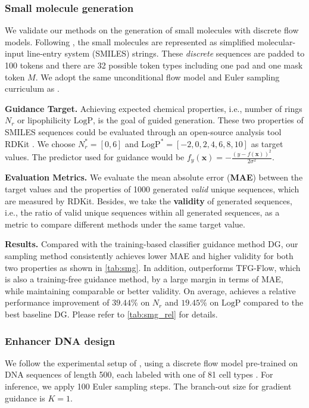 \subsubsection{Small molecule generation} 

We validate our methods on the generation of small molecules with discrete flow models. Following \citet{nisonoff2024unlocking}, the small molecules are represented as simplified molecular-input line-entry system (SMILES) strings. These \textit{discrete} sequences are padded to 100 tokens and there are 32 possible token types including one pad and one mask token $M$. We adopt the same unconditional flow model and Euler sampling curriculum as \citet{nisonoff2024unlocking}.

\textbf{Guidance Target.} Achieving expected chemical properties, i.e., number of rings $N_r$ or lipophilicity $\mathrm{LogP}$, is the goal of guided generation. These two properties of SMILES sequences could be evaluated through an open-source analysis tool RDKit \citep{landrum2013rdkit}. We choose $N_r^*=[0,6]$ and $\mathrm{LogP}^*=[-2,0,2,4,6,8,10]$ as target values.
The predictor used for guidance would be
$f_y(\boldsymbol{x})= -\frac{(y-f(\boldsymbol{x}))^2}{2\sigma^2}$.

\textbf{Evaluation Metrics.} We evaluate the mean absolute error (\textbf{MAE}) between the target values and the properties of 1000 generated \textit{valid} unique sequences, which are measured by RDKit. Besides, we take the \textbf{validity} of generated sequences, i.e., the ratio of valid unique sequences within all generated sequences,  as a metric to compare different methods under the same target value. 

\textbf{Results.} Compared with the training-based classifier guidance method DG, our sampling method \xtsampling consistently achieves lower MAE and higher validity for both two properties as shown in  \cref{tab:smg}. In addition, \xtsampling outperforms TFG-Flow, which is also a training-free guidance method, by a large margin in terms of MAE, while maintaining comparable or better validity. 
On average, \xtsampling achieves a relative performance improvement of $39.44\%$ on $N_r$ and $19.45\%$ on $\mathrm{LogP}$ compared to the best baseline DG. Please refer to \cref{tab:smg_rel} for details.






\subsubsection{Enhancer DNA design}
We follow the experimental setup of \citet{stark2024dirichlet}, using a discrete flow model pre-trained on DNA sequences of length 500, each labeled with one of 81 cell types \cite{janssens2022decoding, taskiran2024cell}. For inference, we apply 100 Euler sampling steps. The branch-out size for gradient guidance \xtgrad is $K=1$.

